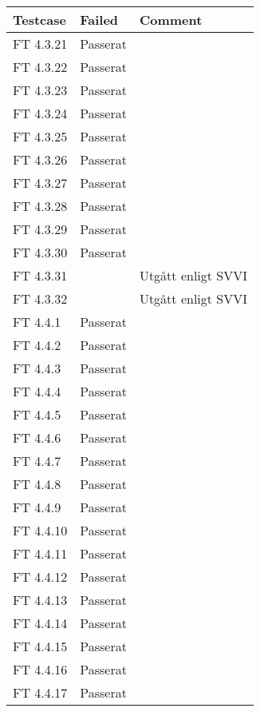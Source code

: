 \documentclass[a4paper]{article}
\begin{document}
\begin{tabular}{| l | l | p{11cm} |}
\hline
Testcase &  Failed & Comment\\
\hline
FT 4.3.21 & Passerat & \\
\hline
FT 4.3.22 & Passerat & \\
\hline
FT 4.3.23 & Passerat & \\
\hline
FT 4.3.24 & Passerat & \\
\hline
FT 4.3.25 & Passerat & \\
\hline
FT 4.3.26 & Passerat & \\
\hline
FT 4.3.27 & Passerat & \\
\hline
FT 4.3.28 & Passerat & \\
\hline
FT 4.3.29 & Passerat & \\
\hline
FT 4.3.30 & Passerat & \\
\hline
FT 4.3.31 & & Utgått enligt SVVI\\
\hline
FT 4.3.32 & & Utgått enligt SVVI\\
\hline
FT 4.4.1 & Passerat & \\
\hline
FT 4.4.2 & Passerat & \\
\hline
FT 4.4.3 & Passerat & \\
\hline
FT 4.4.4 & Passerat & \\
\hline
FT 4.4.5 & Passerat & \\
\hline
FT 4.4.6 & Passerat & \\
\hline
FT 4.4.7 & Passerat & \\
\hline
FT 4.4.8 & Passerat & \\
\hline
FT 4.4.9 & Passerat & \\
\hline
FT 4.4.10 & Passerat & \\
\hline
FT 4.4.11 & Passerat & \\
\hline
FT 4.4.12 & Passerat & \\
\hline
FT 4.4.13 & Passerat & \\
\hline
FT 4.4.14 & Passerat & \\
\hline
FT 4.4.15 & Passerat & \\
\hline
FT 4.4.16 & Passerat & \\
\hline
FT 4.4.17 & Passerat & \\
\hline
\end{tabular}
\end{document}
